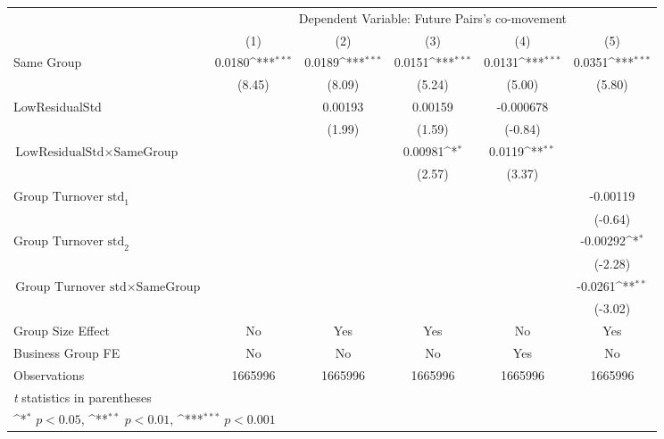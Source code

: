 {
\def\sym#1{\ifmmode^{#1}\else\(^{#1}\)\fi}
\begin{tabular}{l*{5}{c}}
\hline\hline
                &\multicolumn{5}{c}{Dependent Variable: Future Pairs's co-movement}                            \\\cmidrule(lr){2-6}
                &\multicolumn{1}{c}{(1)}         &\multicolumn{1}{c}{(2)}         &\multicolumn{1}{c}{(3)}         &\multicolumn{1}{c}{(4)}         &\multicolumn{1}{c}{(5)}         \\
\hline
Same Group      &   0.0180\sym{***}&   0.0189\sym{***}&   0.0151\sym{***}&   0.0131\sym{***}&   0.0351\sym{***}\\
                &   (8.45)         &   (8.09)         &   (5.24)         &   (5.00)         &   (5.80)         \\
[1em]
LowResidualStd  &                  &  0.00193         &  0.00159         &-0.000678         &                  \\
                &                  &   (1.99)         &   (1.59)         &  (-0.84)         &                  \\
[1em]
$ {\text{LowResidualStd} } \times {\text{SameGroup} }  $ &                  &                  &  0.00981\sym{*}  &   0.0119\sym{**} &                  \\
                &                  &                  &   (2.57)         &   (3.37)         &                  \\
[1em]
 $ {\text{Group Turnover std}_1} $ &                  &                  &                  &                  & -0.00119         \\
                &                  &                  &                  &                  &  (-0.64)         \\
[1em]
 $ {\text{Group Turnover std}_2} $ &                  &                  &                  &                  & -0.00292\sym{*}  \\
                &                  &                  &                  &                  &  (-2.28)         \\
[1em]
$ {\text{Group Turnover std} } \times {\text{SameGroup} }  $ &                  &                  &                  &                  &  -0.0261\sym{**} \\
                &                  &                  &                  &                  &  (-3.02)         \\
\hline
Group Size Effect&       No         &      Yes         &      Yes         &       No         &      Yes         \\
Business Group FE&       No         &       No         &       No         &      Yes         &       No         \\
Observations    &  1665996         &  1665996         &  1665996         &  1665996         &  1665996         \\
\hline\hline
\multicolumn{6}{l}{\footnotesize \textit{t} statistics in parentheses}\\
\multicolumn{6}{l}{\footnotesize \sym{*} \(p<0.05\), \sym{**} \(p<0.01\), \sym{***} \(p<0.001\)}\\
\end{tabular}
}
